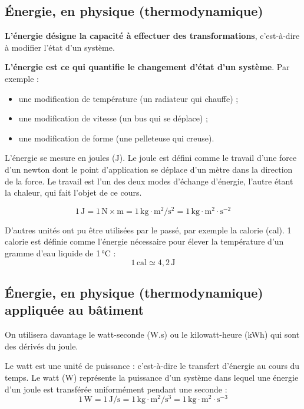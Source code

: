 \subsection*{Énergie, en physique (thermodynamique)}
\textbf{L'énergie désigne la capacité à effectuer des transformations}, c'est-à-dire à modifier l'état d'un système.

\textbf{L'énergie est ce qui quantifie le changement d'état d'un système}. Par exemple :
\begin{itemize}
  \item une modification de température (un radiateur qui chauffe) ;
  \item une modification de vitesse (un bus qui se déplace) ;
  \item une modification de forme (une pelleteuse qui creuse).
\end{itemize}

L’énergie se mesure en joules (J). Le joule est défini comme le travail d’une force d’un newton dont le point d’application se déplace d’un mètre dans la direction de la force. Le travail est l’un des deux modes d’échange d’énergie, l’autre étant la chaleur, qui fait l’objet de ce cours.

\begin{equation}
  1\,\mathrm{J} = 1\,\mathrm{N}\times\mathrm{m} = 1\,\mathrm{kg\cdot m^2/s^2} = 1\,\mathrm{kg\cdot m^{2}\cdot s^{-2}}
\end{equation}

D'autres unités ont pu être utilisées par le passé, par exemple la calorie (cal).
1 calorie est définie comme l'énergie nécessaire pour élever la température d'un gramme d'eau liquide de 1\,°C :
\begin{equation}
  1\,\mathrm{cal} \simeq 4{,}2\,\mathrm{J}
\end{equation}


\subsection*{Énergie, en physique (thermodynamique) appliquée au bâtiment}
On utilisera davantage le watt-seconde (W.s) ou le kilowatt-heure (kWh) qui sont des dérivés du joule.

Le watt est une unité de puissance : c'est-à-dire le transfert d'énergie au cours du temps.
Le watt (W) représente la puissance d'un système dans lequel une énergie d'un joule est transférée uniformément pendant une seconde :
\begin{equation}
  1\,\mathrm{W} = 1\,\mathrm{J/s} = 1\,\mathrm{kg\cdot m^2/s^3} = 1\,\mathrm{kg\cdot m^{2}\cdot s^{-3}}
\end{equation}

